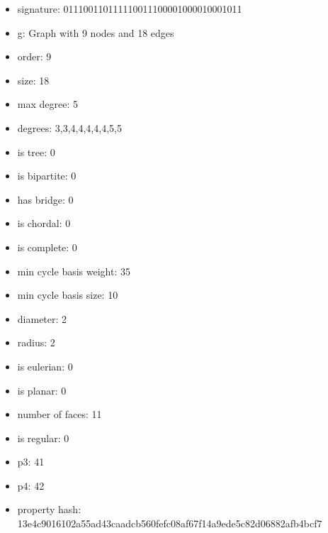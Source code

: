 \newpage
\begin{figure}
\end{figure}
\begin{itemize}
\item signature: 011100110111110011100001000010001011
\item g: Graph with 9 nodes and 18 edges
\item order: 9
\item size: 18
\item max degree: 5
\item degrees: 3,3,4,4,4,4,4,5,5
\item is tree: 0
\item is bipartite: 0
\item has bridge: 0
\item is chordal: 0
\item is complete: 0
\item min cycle basis weight: 35
\item min cycle basis size: 10
\item diameter: 2
\item radius: 2
\item is eulerian: 0
\item is planar: 0
\item number of faces: 11
\item is regular: 0
\item p3: 41
\item p4: 42
\item property hash: 13e4c9016102a55ad43caadcb560fefc08af67f14a9ede5c82d06882afb4bcf7
\end{itemize}
